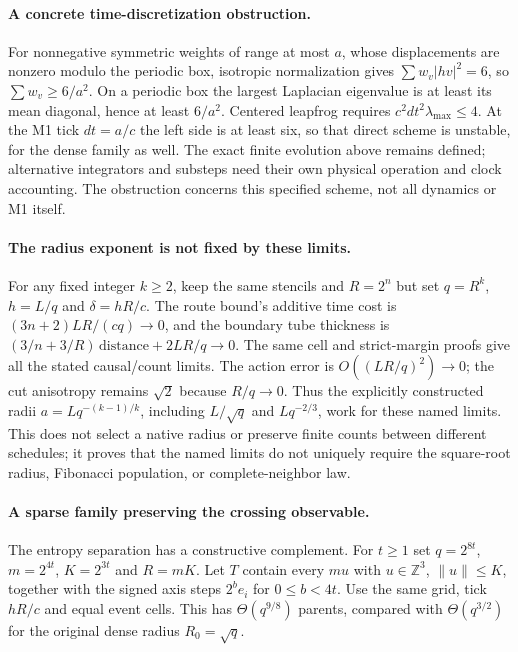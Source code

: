 \paragraph{A concrete time-discretization obstruction.}
For nonnegative symmetric weights of range at most $a$, whose displacements
are nonzero modulo the periodic box, isotropic
normalization gives $\sum w_v|hv|^2=6$, so $\sum w_v\ge6/a^2$. On a
periodic box the largest Laplacian eigenvalue is at least its mean diagonal,
hence at least $6/a^2$. Centered leapfrog requires
$c^2dt^2\lambda_{\max}\le4$. At the M1 tick $dt=a/c$ the left side is at
least six, so that direct scheme is unstable, for the dense family as well.
The exact finite evolution above remains defined; alternative integrators
and substeps need their own physical operation and clock accounting. The
obstruction concerns this specified scheme, not all dynamics or M1 itself.

\paragraph{The radius exponent is not fixed by these limits.}
For any fixed integer $k\ge2$, keep the same stencils and $R=2^n$ but set
$q=R^k$, $h=L/q$ and $\delta=hR/c$. The route bound's additive time cost
is $(3n+2)LR/(cq)\to0$, and the boundary tube thickness is
$(3/n+3/R)\,\mathrm{distance}+2LR/q\to0$. The same cell and strict-margin
proofs give all the stated causal/count limits. The action error is
$O((LR/q)^2)\to0$; the cut anisotropy remains $\sqrt2$ because $R/q\to0$.
Thus the explicitly constructed radii $a=Lq^{-(k-1)/k}$, including
$L/\sqrt q$ and $Lq^{-2/3}$, work for these named limits. This does not
select a native radius or preserve finite counts between different schedules;
it proves that the named limits do not uniquely require the square-root
radius, Fibonacci population, or complete-neighbor law.

\paragraph{A sparse family preserving the crossing observable.}
The entropy separation has a constructive complement. For $t\ge1$ set
$q=2^{8t}$, $m=2^{4t}$, $K=2^{3t}$ and $R=mK$. Let $T$ contain every
$mu$ with $u\in\mathbb Z^3$, $\|u\|\le K$, together with the signed
axis steps $2^b e_i$ for $0\le b<4t$. Use the same grid, tick $hR/c$
and equal event cells. This has $\Theta(q^{9/8})$ parents, compared with
$\Theta(q^{3/2})$ for the original dense radius $R_0=\sqrt q$.

